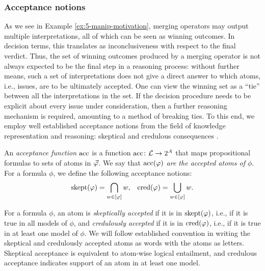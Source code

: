 \subsubsection{Acceptance notions}
As we see in Example \ref{ex:5-manip-motivation},
merging operators may output multiple interpretations,
all of which can be seen as winning outcomes.
In decision terms, this translates as inconclusiveness with respect to the final verdict.
Thus, the set of winning outcomes produced by a merging operator 
is not always expected to be the final step in a reasoning process: 
without further means, such a set of interpretations 
does not give a direct answer to which atoms, i.e., issues,
are to be ultimately accepted.
One can view the winning set as a ``tie'' 
between all the interpretations in the set. 
If the decision procedure needs to be explicit about every issue under consideration, 
then a further reasoning mechanism is required, amounting to a method of breaking ties.
To this end, we employ well established acceptance notions 
from the field of knowledge representation and reasoning: 
skeptical and credulous consequences \cite{StrasserA19}.

An \emph{acceptance function $\acc$} is a function 
$\acc\colon\L\rightarrow 2^{\Atoms}$
that maps propositional formulas to sets of atoms in $\P$.
We say that \emph{$\acc(\phi)$ are the accepted atoms of $\phi$}.
For a formula $\phi$, we define the following acceptance notions:
\begin{align*}
\skept(\phi) = \bigcap_{w \in [\phi]}w, && \cred(\phi) = \bigcup_{w\in [\phi]}w.
\end{align*}

For a formula $\phi$, 
an atom is \emph{skeptically accepted} if it is in $\skept(\phi)$,
i.e., if it is true in all models of $\phi$,
and \emph{credulously accepted} 
if it is in $\cred(\phi)$, i.e., if it is true in at least one model of $\phi$.
We will follow established convention in writing the skeptical and credulously accepted
atoms as words with the atoms as letters.
Skeptical acceptance is equivalent to atom-wise logical entailment, 
and credulous acceptance indicates support of an atom in at least one model. 

